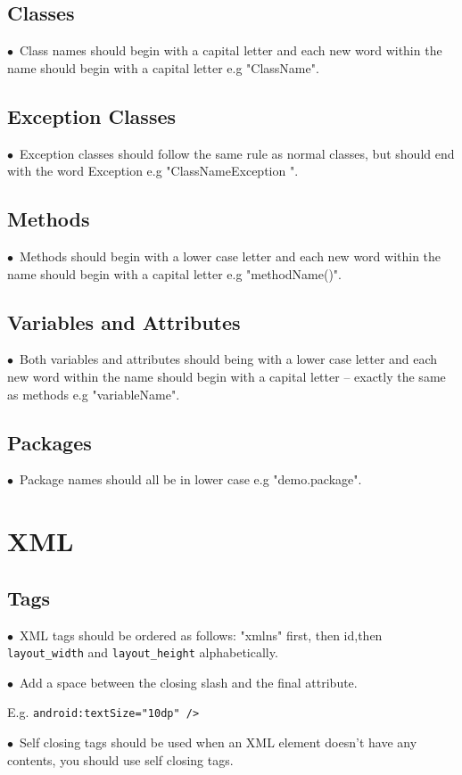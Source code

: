 \documentclass[english]{article}
\begin{document}
					\subsection{ Classes }
$\bullet$\ Class names should begin with a capital letter and each new word within the name should begin with a capital letter e.g "ClassName".\par

				\subsection{Exception Classes}
$\bullet$\ Exception classes should follow the same rule as normal classes, but should end with the word Exception e.g "ClassNameException ".\par
\subsection{Methods}
$\bullet$\ Methods should begin with a lower case letter and each new word within the name should begin with a capital letter e.g "methodName()".\par
\subsection{Variables and Attributes }
$\bullet$\ Both variables and attributes should being with a lower case letter and each new word within the name should begin with a capital letter – exactly the same as methods e.g "variableName".\par
\subsection{Packages}
$\bullet$\ Package names should all be in lower case e.g "demo.package".\par

	\section{XML	}
	
	\subsection{Tags}
$\bullet$\ XML tags should be ordered as follows: "xmlns" first, then id,then  \texttt{layout\_width} and  \texttt{layout\_height} alphabetically. \par
$\bullet$\ Add a space between the closing slash and the final attribute.\par E.g.  \texttt{android:textSize="10dp" /> }\par
$\bullet$\ Self closing tags should be used when an XML element doesn't have any contents, you should use self closing tags. \par
\end{document}
